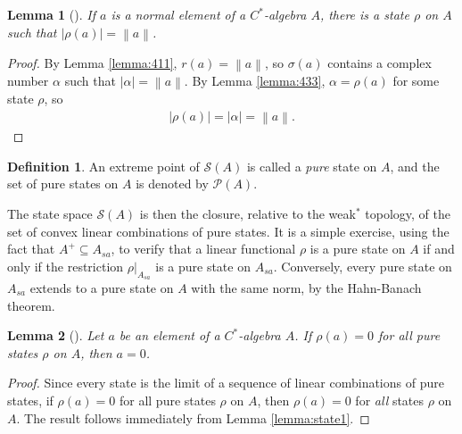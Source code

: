\documentclass[11pt,a4paper]{report}
\theoremstyle{plain}
\newtheorem{lemma}{Lemma}
\theoremstyle{definition}
\newtheorem{defn}{Definition}
\newcommand{\1}{\mathbbm{1}}
\renewcommand{\S}{\mathscr{S}}
\renewcommand{\P}[1]{\mathscr{P}(#1)}
\newcommand{\spec}[1]{\sigma(#1)}
\begin{document}
\begin{lemma}[{\cite[4.3.4,(iv)]{kadison83}}]\label{lemma:state2}
	If $a$ is a normal element of a $C^\ast$-algebra $A$, there is a state $\rho$ 
	on $A$ such that $|\rho(a)|=\left\|a\right\|$.
\end{lemma}
\begin{proof}
	By Lemma \ref{lemma:411}, $r(a)=\left\|a\right\|$, so $\spec a$ contains a 
	complex number $\alpha$ such that $|\alpha|=\left\|a\right\|$. By Lemma 
	\ref{lemma:433}, $\alpha=\rho(a)$ for some state $\rho$, so 
	\begin{align*}
		|\rho(a)|=|\alpha|=\left\|a\right\|.
	\end{align*}
\end{proof}

\begin{defn}
	An extreme point of $\S(A)$ is called a \emph{pure} state on $A$, and the set 
	of pure states on $A$ is denoted by $\P{A}$.
\end{defn}
The state space $\S(A)$ is then the closure, relative to the weak$^\ast$ 
topology, of the set of convex linear combinations of pure states. 
It is a simple exercise, using the fact that $A^+\subseteq A_{sa}$, to verify 
that a linear functional $\rho$ is a pure state on $A$ if and only if the 
restriction $\rho|_{A_{sa}}$ is a pure state on $A_{sa}$.
Conversely, every pure state on $A_{sa}$ extends to a pure state on $A$ with the 
same norm, by the Hahn-Banach theorem.
 

\begin{lemma}[{\cite[4.3.8,(i)]{kadison83}}]\label{lemma:pure1}
	Let $a$ be an element of a $C^\ast$-algebra $A$. If $\rho(a)=0$ for all 
	\emph{pure} states $\rho$ on $A$, then $a=0$.
\end{lemma}
\begin{proof}
	Since every state is the limit of a sequence of linear combinations of pure 
	states, if $\rho(a)=0$ for all pure states $\rho$ on $A$, then $\rho(a)=0$ for 
	\emph{all} states $\rho$ on $A$. The result follows immediately from Lemma 
	\ref{lemma:state1}.
\end{proof}
\end{document}
